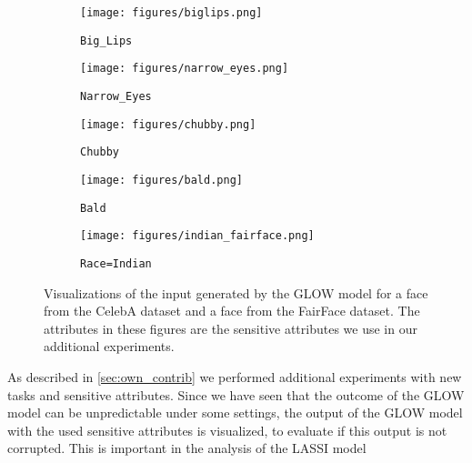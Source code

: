 \begin{figure}[H]
\centering
\begin{subfigure}{\textwidth}
  \centering
  \vspace{2mm}
  \texttt{[image: figures/biglips.png]}
  \caption{\texttt{Big\_Lips}}
  \label{fig:big_lips_apdx}
\end{subfigure}
\begin{subfigure}{\textwidth}
  \centering
  \vspace{2mm}
  \texttt{[image: figures/narrow\_eyes.png]}
  \caption{\texttt{Narrow\_Eyes}}
  \label{fig:narrow_eyes_apdx}
\end{subfigure}
\begin{subfigure}{\textwidth}
  \centering
  \vspace{2mm}
  \texttt{[image: figures/chubby.png]}
  \caption{\texttt{Chubby}}
  \label{fig:chubby_apdx}
\end{subfigure}
\begin{subfigure}{\textwidth}
  \centering
  \vspace{2mm}
  \texttt{[image: figures/bald.png]}
  \caption{\texttt{Bald}}
  \label{fig:bald_apdx}
\end{subfigure}
\begin{subfigure}{\textwidth}
  \centering
  \vspace{2mm}
  \texttt{[image: figures/indian\_fairface.png]}
  \caption{\texttt{Race=Indian}}
  \label{fig:indian_apdx}
\end{subfigure}
\caption{Visualizations of the input generated by the GLOW model for a face from the CelebA dataset and a face from the FairFace dataset. The attributes in these figures are the sensitive attributes we use in our additional experiments.}
\label{fig:larger_visualisations}
\end{figure}

As described in \ref{sec:own_contrib} we performed additional experiments with new tasks and sensitive attributes. Since we have seen that the outcome of the GLOW model can be unpredictable under some settings, the output of the GLOW model with the used sensitive attributes is visualized, to evaluate if this output is not corrupted. This is important in the analysis of the LASSI model \newline


